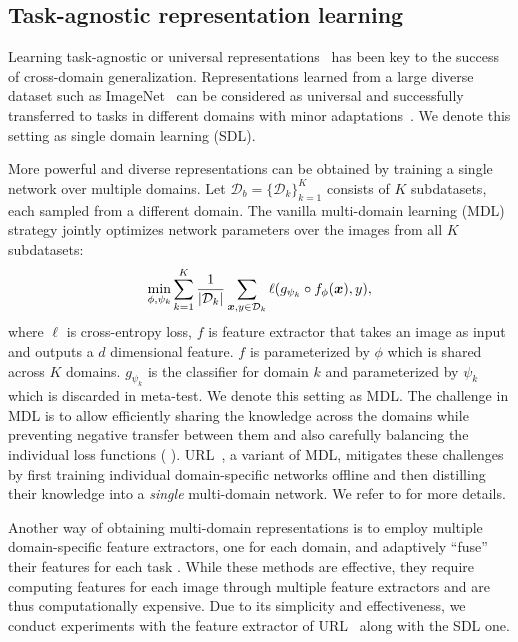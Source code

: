 \subsection{Task-agnostic representation learning}
Learning task-agnostic or universal representations~\cite{bilen2017universal} has been key to the success of cross-domain generalization.
Representations learned from a large diverse dataset such as ImageNet~\cite{deng2009imagenet} can be considered as universal and successfully transferred to tasks in different domains with minor adaptations~\cite{rebuffi2017learning,liu2020universal,dvornik2020selecting}.
We denote this setting as single domain learning (SDL).

More powerful and diverse representations can be obtained by training a single network over multiple domains.
Let $\mathcal{D}_{b}=\{\mathcal{D}_{k}\}_{k=1}^{K}$ consists of $K$ subdatasets, each sampled from a different domain. 
The vanilla multi-domain learning (MDL) strategy jointly optimizes network parameters over the images from all $K$ subdatasets:
\begin{equation}\label{eq:mtl}
    \min_{\phi, \psi_{k}} \sum_{k=1}^{K} \frac{1}{|\mathcal{D}_{k}|} \sum_{\bm{x}, y \in \mathcal{D}_{k}} \ell(g_{\psi_{k}} \circ f_{\phi}(\bm{x}), y),
\end{equation} where $\ell$ is cross-entropy loss, $f$ is feature extractor that takes an image as input and outputs a $d$ dimensional feature.
$f$ is parameterized by $\phi$ which is shared across $K$ domains. 
$g_{\psi_{k}}$ is the classifier for domain $k$ and parameterized by $\psi_k$ which is discarded in meta-test.
We denote this setting as MDL.
The challenge in MDL is to allow efficiently sharing the knowledge across the domains while preventing negative transfer between them and also carefully balancing the individual loss functions ( \cite{chen2018gradnorm}). 
URL~\cite{li2021universal}, a variant of MDL, mitigates these challenges by first training individual domain-specific networks offline and then distilling their knowledge into a \emph{single} multi-domain network.
We refer to \cite{li2021universal} for more details.

Another way of obtaining multi-domain representations is to employ multiple domain-specific feature extractors, one for each domain, and adaptively ``fuse'' their features for each task \cite{dvornik2020selecting,liu2021multi,triantafillou2021flute}.
While these methods are effective, they require computing features for each image through multiple feature extractors and are thus computationally expensive.
Due to its simplicity and effectiveness, we conduct experiments with the feature extractor of URL~\cite{li2021universal} along with the SDL one.

